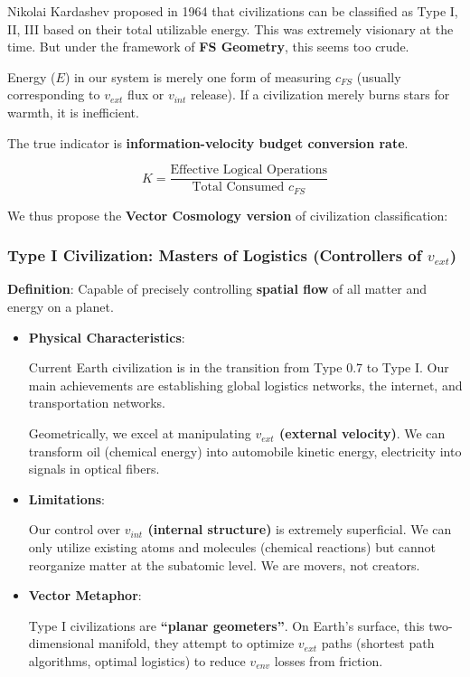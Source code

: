 Nikolai Kardashev proposed in 1964 that civilizations can be classified as Type I, II, III based on their total utilizable energy. This was extremely visionary at the time. But under the framework of \textbf{FS Geometry}, this seems too crude.

Energy ($E$) in our system is merely one form of measuring $c_{FS}$ (usually corresponding to $v_{ext}$ flux or $v_{int}$ release). If a civilization merely burns stars for warmth, it is inefficient.

The true indicator is \textbf{information-velocity budget conversion rate}.

\[K = \frac{\text{Effective Logical Operations}}{\text{Total Consumed } c_{FS}}\]

We thus propose the \textbf{Vector Cosmology version} of civilization classification:

\subsubsection{Type I Civilization: Masters of Logistics (Controllers of $v_{ext}$)}

\textbf{Definition}: Capable of precisely controlling \textbf{spatial flow} of all matter and energy on a planet.

\begin{itemize}
\item \textbf{Physical Characteristics}:

    Current Earth civilization is in the transition from Type 0.7 to Type I. Our main achievements are establishing global logistics networks, the internet, and transportation networks.

    Geometrically, we excel at manipulating \textbf{$v_{ext}$ (external velocity)}. We can transform oil (chemical energy) into automobile kinetic energy, electricity into signals in optical fibers.

\item \textbf{Limitations}:

    Our control over \textbf{$v_{int}$ (internal structure)} is extremely superficial. We can only utilize existing atoms and molecules (chemical reactions) but cannot reorganize matter at the subatomic level. We are movers, not creators.

\item \textbf{Vector Metaphor}:

    Type I civilizations are \textbf{``planar geometers''}. On Earth's surface, this two-dimensional manifold, they attempt to optimize $v_{ext}$ paths (shortest path algorithms, optimal logistics) to reduce $v_{env}$ losses from friction.
\end{itemize}

